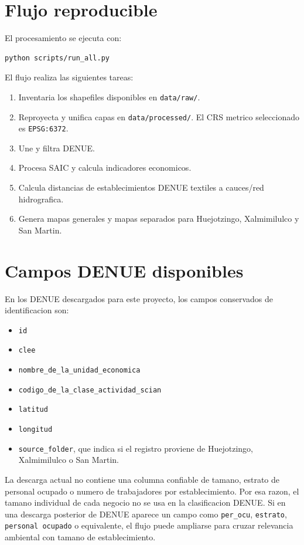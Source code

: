 \documentclass[11pt,letterpaper]{article}
\begin{document}
\section{Flujo reproducible}

El procesamiento se ejecuta con:

\begin{verbatim}
python scripts/run_all.py
\end{verbatim}

El flujo realiza las siguientes tareas:

\begin{enumerate}
  \item Inventaria los shapefiles disponibles en \texttt{data/raw/}.
  \item Reproyecta y unifica capas en \texttt{data/processed/}. El CRS metrico seleccionado es \texttt{EPSG:6372}.
  \item Une y filtra DENUE.
  \item Procesa SAIC y calcula indicadores economicos.
  \item Calcula distancias de establecimientos DENUE textiles a cauces/red hidrografica.
  \item Genera mapas generales y mapas separados para Huejotzingo, Xalmimilulco y San Martin.
\end{enumerate}

\section{Campos DENUE disponibles}

En los DENUE descargados para este proyecto, los campos conservados de identificacion son:

\begin{itemize}
  \item \texttt{id}
  \item \texttt{clee}
  \item \texttt{nombre\_de\_la\_unidad\_economica}
  \item \texttt{codigo\_de\_la\_clase\_actividad\_scian}
  \item \texttt{latitud}
  \item \texttt{longitud}
  \item \texttt{source\_folder}, que indica si el registro proviene de Huejotzingo, Xalmimilulco o San Martin.
\end{itemize}

La descarga actual no contiene una columna confiable de tamano, estrato de personal ocupado o numero de trabajadores por establecimiento. Por esa razon, el tamano individual de cada negocio no se usa en la clasificacion DENUE. Si en una descarga posterior de DENUE aparece un campo como \texttt{per\_ocu}, \texttt{estrato}, \texttt{personal ocupado} o equivalente, el flujo puede ampliarse para cruzar relevancia ambiental con tamano de establecimiento.
\end{document}
